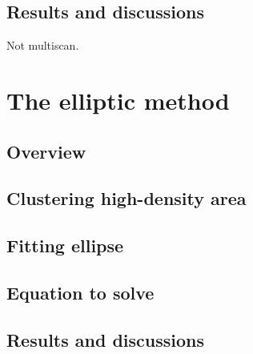 \subsection{Results and discussions}
Not multiscan.


\section{The elliptic method}


\subsection{Overview}


\subsection{Clustering high-density area}


\subsection{Fitting ellipse}


\subsection{Equation to solve}


\subsection{Results and discussions}
